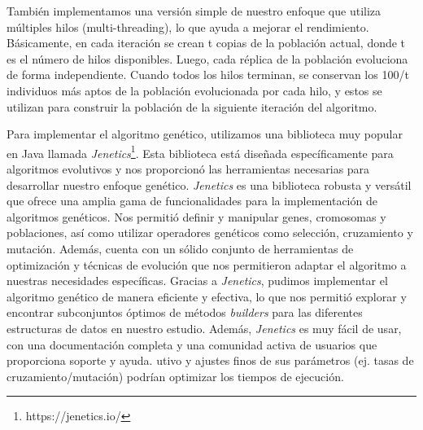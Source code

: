 También implementamos una versión simple de nuestro enfoque que utiliza
múltiples hilos (multi-threading), lo que ayuda a mejorar el rendimiento.
Básicamente, en cada iteración se crean t copias de la población actual, donde t
es el número de hilos disponibles. Luego, cada réplica de la población
evoluciona de forma independiente. Cuando todos los hilos terminan, se conservan
los 100/t individuos más aptos de la población evolucionada por cada hilo, y
estos se utilizan para construir la población de la siguiente iteración del
algoritmo. 

Para implementar el algoritmo genético, utilizamos una biblioteca muy popular en Java llamada \emph{Jenetics}\footnote{https://jenetics.io/}. Esta biblioteca está diseñada específicamente para algoritmos evolutivos y nos proporcionó las herramientas necesarias para desarrollar nuestro enfoque genético.
\emph{Jenetics} es una biblioteca robusta y versátil que ofrece una amplia gama de funcionalidades para la implementación de algoritmos genéticos. Nos permitió definir y manipular genes, cromosomas y poblaciones, así como utilizar operadores genéticos como selección, cruzamiento y mutación. Además, cuenta con un sólido conjunto de herramientas de optimización y técnicas de evolución que nos permitieron adaptar el algoritmo a nuestras necesidades específicas.
Gracias a \emph{Jenetics}, pudimos implementar el algoritmo genético de manera eficiente y efectiva, lo que nos permitió explorar y encontrar subconjuntos óptimos de métodos \emph{builders} para las diferentes estructuras de datos en nuestro estudio. Además, \emph{Jenetics} es muy fácil de usar, con una documentación completa y una comunidad activa de usuarios que proporciona soporte y ayuda.
utivo y ajustes finos de sus parámetros (ej. tasas de cruzamiento/mutación) podrían optimizar los tiempos de ejecución.




